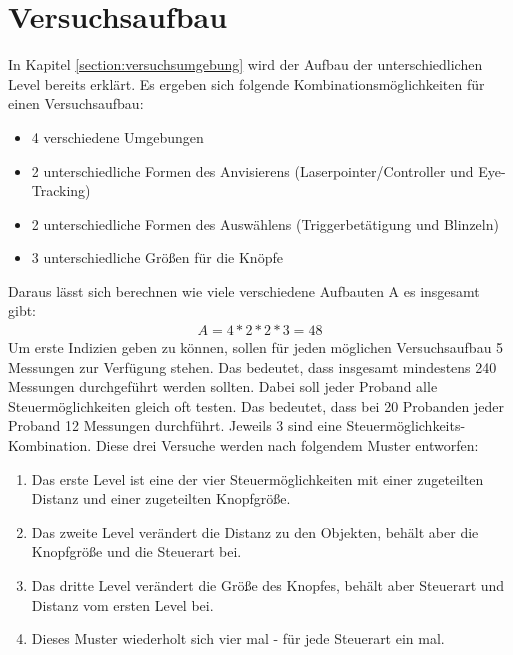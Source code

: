 \section{Versuchsaufbau} 
In Kapitel \ref{section:versuchsumgebung} wird der Aufbau der unterschiedlichen Level bereits erklärt. Es ergeben sich folgende Kombinationsmöglichkeiten für einen Versuchsaufbau:
\begin{itemize}
	\item 4 verschiedene Umgebungen
	\item 2 unterschiedliche Formen des Anvisierens (Laserpointer/Controller und Eye-Tracking)
	\item 2 unterschiedliche Formen des Auswählens (Triggerbetätigung und Blinzeln)
	\item 3 unterschiedliche Größen für die Knöpfe
\end{itemize}
Daraus lässt sich berechnen wie viele verschiedene Aufbauten A es insgesamt gibt:
\begin{align}
	A=4*2*2*3=48
\end{align}
Um erste Indizien geben zu können, sollen für jeden möglichen Versuchsaufbau 5  Messungen zur Verfügung stehen. Das bedeutet, dass insgesamt mindestens 240 Messungen durchgeführt werden sollten. Dabei soll jeder Proband alle Steuermöglichkeiten gleich oft testen. Das bedeutet, dass bei 20 Probanden jeder Proband 12  Messungen durchführt. Jeweils 3  sind eine Steuermöglichkeits-Kombination. Diese drei Versuche werden nach folgendem Muster entworfen:
\begin{enumerate}
	\item Das erste Level ist eine der vier Steuermöglichkeiten mit einer zugeteilten Distanz und einer zugeteilten Knopfgröße.
	\item Das zweite Level verändert die Distanz zu den Objekten, behält aber die Knopfgröße und die Steuerart bei.
	\item Das dritte Level verändert die Größe des Knopfes, behält aber Steuerart und Distanz vom ersten Level bei.
	\item Dieses Muster wiederholt sich vier mal - für jede Steuerart ein mal.
\end{enumerate}
